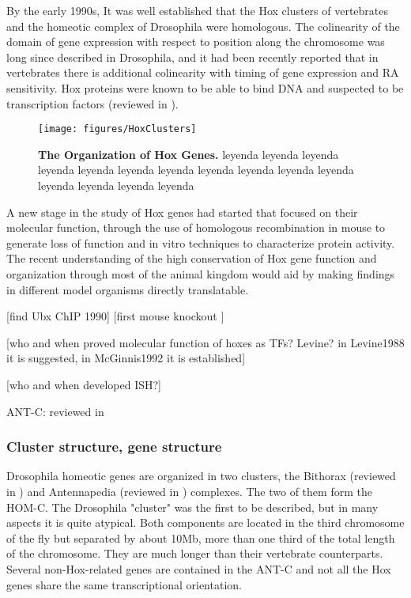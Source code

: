By the early 1990s, It was well established that the Hox clusters of vertebrates and the homeotic complex of Drosophila were homologous. The colinearity of the domain of gene expression with respect to position along the chromosome was long since described in  Drosophila, and it had been recently reported that in vertebrates there is additional colinearity with timing of gene expression and RA sensitivity. Hox proteins were known to be able to bind DNA and suspected to be transcription factors (reviewed in \cite{Levine1988, McGinnis1992}). 

\begin{figure}[]
  
  \centering
  \label{fig:hoxclusters}
  \texttt{[image: figures/HoxClusters]}
  \caption[The Organization of Hox Genes]{\textbf{The Organization of Hox Genes.} leyenda leyenda leyenda leyenda leyenda leyenda leyenda leyenda leyenda leyenda leyenda leyenda leyenda leyenda leyenda}
\end{figure}

A new stage in the study of Hox genes had started that focused on their molecular function, through the use of homologous recombination in mouse to generate loss of function and in vitro techniques to characterize protein activity. The recent understanding of the high conservation of Hox gene function and organization through most of the animal kingdom would aid by making findings in different model organisms directly translatable. 

[find Ubx ChIP 1990]
[first mouse knockout \cite{Thomas1987}]



[who and when proved molecular function of hoxes as TFs? Levine? in Levine1988 it is suggested, in McGinnis1992 it is established]

[who and when developed ISH?]


\ac{ANT-C}: reviewed in \cite{Kaufman1990}




\subsubsection{Cluster structure, gene structure}


Drosophila homeotic genes are organized in two clusters, the  Bithorax (reviewed in \cite{Lewis1978}) and Antennapedia (reviewed in \cite{Kaufman1990}) complexes. The two of them form the HOM-C. The Drosophila "cluster" was the first to be described, but in many aspects it is quite atypical. Both components are located in the third chromosome of the fly but separated by about 10Mb, more than one third of the total length of the chromosome. They are much longer than their vertebrate counterparts. Several non-Hox-related genes are contained in the \ac{ANT-C} and not all the Hox genes share the same transcriptional orientation. 

